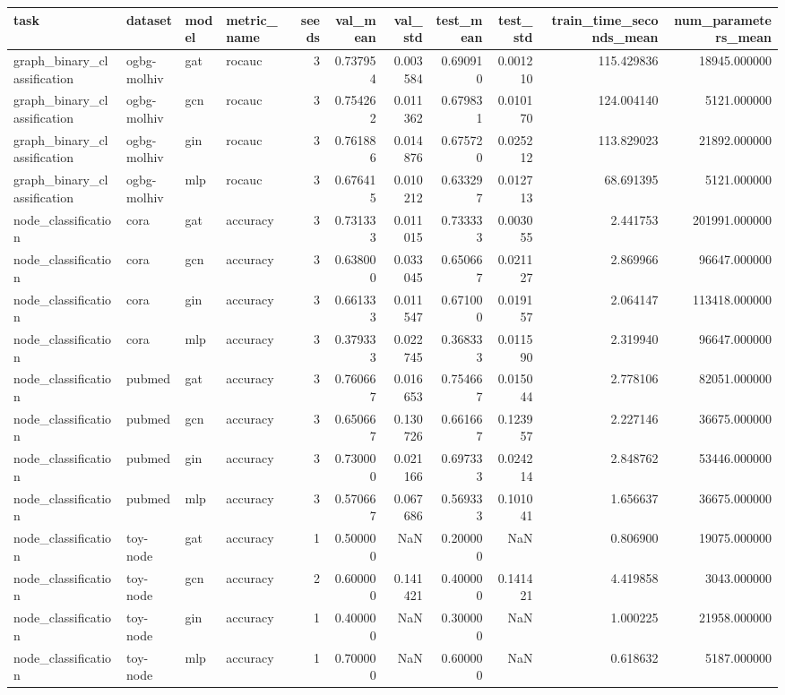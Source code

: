 \begin{tabular}{llllrrrrrrr}
\toprule
task & dataset & model & metric_name & seeds & val_mean & val_std & test_mean & test_std & train_time_seconds_mean & num_parameters_mean \\
\midrule
graph_binary_classification & ogbg-molhiv & gat & rocauc & 3 & 0.737954 & 0.003584 & 0.690910 & 0.001210 & 115.429836 & 18945.000000 \\
graph_binary_classification & ogbg-molhiv & gcn & rocauc & 3 & 0.754262 & 0.011362 & 0.679831 & 0.010170 & 124.004140 & 5121.000000 \\
graph_binary_classification & ogbg-molhiv & gin & rocauc & 3 & 0.761886 & 0.014876 & 0.675720 & 0.025212 & 113.829023 & 21892.000000 \\
graph_binary_classification & ogbg-molhiv & mlp & rocauc & 3 & 0.676415 & 0.010212 & 0.633297 & 0.012713 & 68.691395 & 5121.000000 \\
node_classification & cora & gat & accuracy & 3 & 0.731333 & 0.011015 & 0.733333 & 0.003055 & 2.441753 & 201991.000000 \\
node_classification & cora & gcn & accuracy & 3 & 0.638000 & 0.033045 & 0.650667 & 0.021127 & 2.869966 & 96647.000000 \\
node_classification & cora & gin & accuracy & 3 & 0.661333 & 0.011547 & 0.671000 & 0.019157 & 2.064147 & 113418.000000 \\
node_classification & cora & mlp & accuracy & 3 & 0.379333 & 0.022745 & 0.368333 & 0.011590 & 2.319940 & 96647.000000 \\
node_classification & pubmed & gat & accuracy & 3 & 0.760667 & 0.016653 & 0.754667 & 0.015044 & 2.778106 & 82051.000000 \\
node_classification & pubmed & gcn & accuracy & 3 & 0.650667 & 0.130726 & 0.661667 & 0.123957 & 2.227146 & 36675.000000 \\
node_classification & pubmed & gin & accuracy & 3 & 0.730000 & 0.021166 & 0.697333 & 0.024214 & 2.848762 & 53446.000000 \\
node_classification & pubmed & mlp & accuracy & 3 & 0.570667 & 0.067686 & 0.569333 & 0.101041 & 1.656637 & 36675.000000 \\
node_classification & toy-node & gat & accuracy & 1 & 0.500000 & NaN & 0.200000 & NaN & 0.806900 & 19075.000000 \\
node_classification & toy-node & gcn & accuracy & 2 & 0.600000 & 0.141421 & 0.400000 & 0.141421 & 4.419858 & 3043.000000 \\
node_classification & toy-node & gin & accuracy & 1 & 0.400000 & NaN & 0.300000 & NaN & 1.000225 & 21958.000000 \\
node_classification & toy-node & mlp & accuracy & 1 & 0.700000 & NaN & 0.600000 & NaN & 0.618632 & 5187.000000 \\
\bottomrule
\end{tabular}
